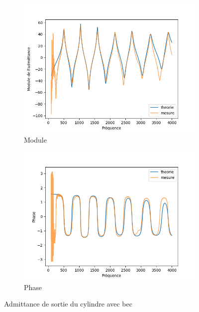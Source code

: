 \documentclass[atiam, article]{rapport} %
\begin{document}
\begin{figure}[H]
  \centering
  \begin{subfigure}[b]{.45\textwidth}
    \centering
    \includegraphics[width=\textwidth]{vents/images_vents/admittance_cylindre+bec_amp.png}
    \caption{Module}
    \label{subfig:admittance_cylindre+bec_amp}
  \end{subfigure}
  \begin{subfigure}[b]{.45\textwidth}
    \centering
    \includegraphics[width=\textwidth]{vents/images_vents/admittance_cylindre+bec_phase.png}
    \caption{Phase}
    \label{subfig:admittance_cylindre+bec_phase}
  \end{subfigure}
  \caption{Admittance de sortie du cylindre avec bec}
  \label{fig:admittance}
\end{figure}
\end{document}
